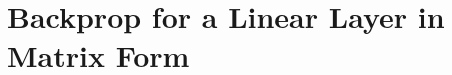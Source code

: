 \section{Backprop for a Linear Layer in Matrix Form}
\label{sec:mlp_backprop:backprop_for_a_linear_layer_in_matrix_form}

